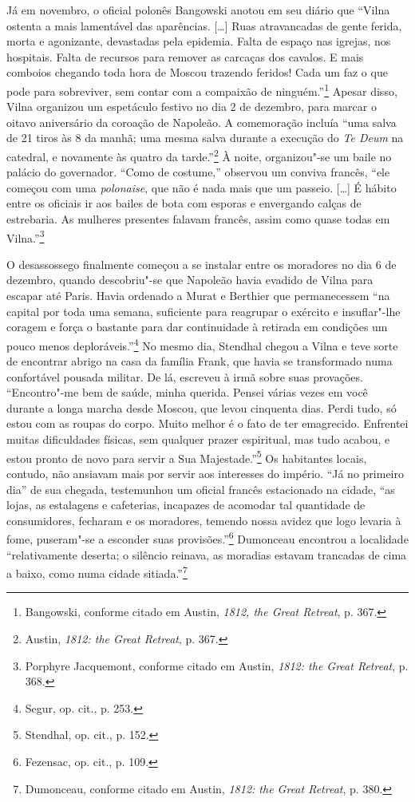 Já em novembro, o oficial polonês Bangowski anotou em seu diário que
``Vilna ostenta a mais lamentável das aparências. [\ldots{}] Ruas
atravancadas de gente ferida, morta e agonizante, devastadas pela
epidemia. Falta de espaço nas igrejas, nos hospitais. Falta de recursos
para remover as carcaças dos cavalos. E mais comboios chegando toda hora
de Moscou trazendo feridos! Cada um faz o que pode para sobreviver, sem
contar com a compaixão de ninguém.''\footnote{Bangowski, conforme citado em Austin, \textit{1812, the Great Retreat}, p. 367.} Apesar disso, Vilna organizou um espetáculo festivo no dia 2 de dezembro, para marcar
o oitavo aniversário da coroação de Napoleão. A comemoração incluía
``uma salva de 21 tiros às 8 da manhã; uma mesma salva durante a
execução do \textit{Te Deum} na catedral, e novamente às quatro da
tarde.''\footnote{Austin, \textit{1812: the Great Retreat}, p. 367.} À
noite, organizou"-se um baile no palácio do governador. ``Como de
costume,'' observou um conviva francês, ``ele começou com uma \textit{polonaise},
que não é nada mais que um passeio. [\ldots{}] É hábito entre os oficiais
ir aos bailes de bota com esporas e envergando calças de estrebaria. As
mulheres presentes falavam francês, assim como quase todas em
Vilna.''\footnote{Porphyre Jacquemont, conforme citado em Austin, \textit{1812: the Great Retreat}, p. 368.}

O desassossego finalmente começou a se instalar entre os moradores no
dia 6 de dezembro, quando descobriu"-se que Napoleão havia evadido de
Vilna para escapar até Paris. Havia ordenado a Murat e Berthier que
permanecessem ``na capital por toda uma semana, suficiente para
reagrupar o exército e insuflar"-lhe coragem e força o bastante para dar
continuidade à retirada em condições um pouco menos
deploráveis.''\footnote{Segur, op. cit., p. 253.} No mesmo dia, Stendhal
chegou a Vilna e teve sorte de encontrar abrigo na casa da família
Frank, que havia se transformado numa confortável pousada militar. De
lá, escreveu à irmã sobre suas provações. ``Encontro"-me bem de saúde,
minha querida. Pensei várias vezes em você durante a longa marcha desde
Moscou, que levou cinquenta dias. Perdi tudo, só estou com as roupas do
corpo. Muito melhor é o fato de ter emagrecido. Enfrentei muitas
dificuldades físicas, sem qualquer prazer espiritual, mas tudo acabou, e
estou pronto de novo para servir a Sua Majestade.''\footnote{Stendhal, op. cit., p. 152.} Os habitantes locais, contudo, não ansiavam mais por servir aos interesses do império. ``Já no primeiro dia'' de sua
chegada, testemunhou um oficial francês estacionado na cidade, ``as
lojas, as estalagens e cafeterias, incapazes de acomodar tal quantidade
de consumidores, fecharam e os moradores, temendo nossa avidez que
logo levaria à fome, puseram"-se a esconder suas provisões.''\footnote{Fezensac, op. cit., p. 109.} Dumonceau encontrou a localidade ``relativamente deserta; o silêncio reinava, as moradias estavam trancadas de cima a
baixo, como numa cidade sitiada.''\footnote{Dumonceau, conforme citado em Austin, \textit{1812: the Great Retreat}, p. 380.}

